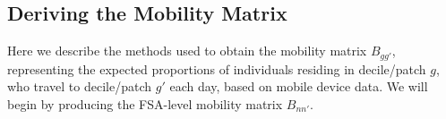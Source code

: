 \clearpage
\subsection{Deriving the Mobility Matrix}\label{app.mob}
Here we describe the methods used to obtain the mobility matrix $B_{gg'}$,
representing the expected proportions of individuals residing in decile/patch $g$,
who travel to decile/patch $g'$ each day,
based on mobile device data.
We will begin by producing the FSA-level mobility matrix $B_{nn'}$.
